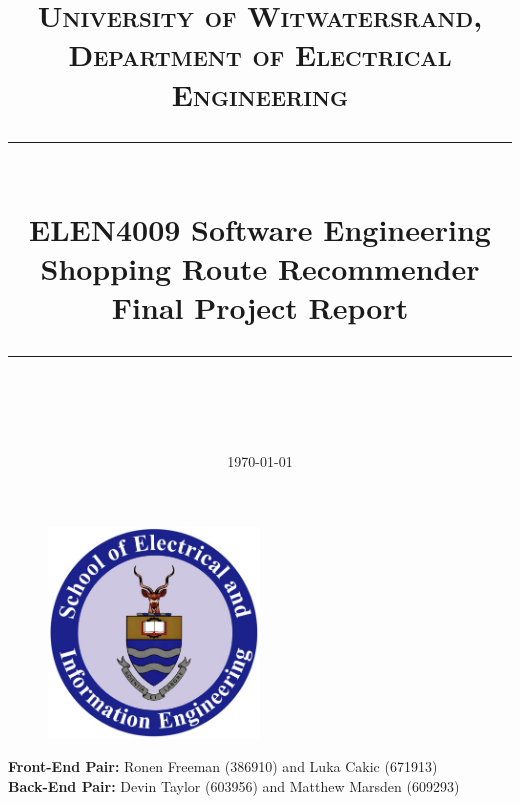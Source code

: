 \documentclass[10pt, a4paper, twocolumn]{scrartcl}
\begin{document}
 

\onecolumn
\thispagestyle{empty}

\newcommand{\horrule}[1]{\rule{\linewidth}{#1}}

	\title{\normalfont \normalsize
		\textsc{University of Witwatersrand, Department of Electrical Engineering} \\ [10pt]
		\horrule{0.5pt} \\ [10pt]
		\huge ELEN4009 Software Engineering \\ Shopping Route Recommender Final Project Report \\
		\horrule{2pt} \\ }
	\date {\normalsize \today}
	
	\maketitle

	\begin{figure}[h!]
		\centering
		\includegraphics[width = 0.5\textwidth]{Images/witsLogo.jpg}
	\end{figure}


\textbf{Front-End Pair:} Ronen Freeman (386910) and Luka Cakic (671913) \\

\textbf{Back-End Pair:} Devin Taylor (603956) and Matthew Marsden (609293)
\end{document}
